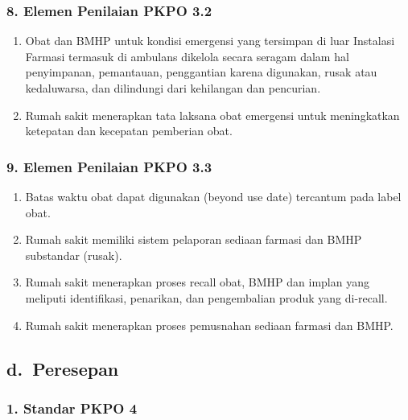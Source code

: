 \documentclass[
]{book}
\providecommand{\tightlist}{%
  \setlength{\itemsep}{0pt}\setlength{\parskip}{0pt}}
\begin{document}
\hypertarget{elemen-penilaian-pkpo-3.2}{%
\subsubsection*{8. Elemen Penilaian PKPO 3.2}\label{elemen-penilaian-pkpo-3.2}}

\begin{enumerate}
\def\labelenumi{\alph{enumi}.}
\tightlist
\item
  Obat dan BMHP untuk kondisi emergensi yang tersimpan di luar Instalasi Farmasi termasuk di ambulans dikelola secara seragam dalam hal penyimpanan, pemantauan, penggantian karena digunakan, rusak atau kedaluwarsa, dan dilindungi dari kehilangan dan pencurian.
\item
  Rumah sakit menerapkan tata laksana obat emergensi untuk meningkatkan ketepatan dan kecepatan pemberian obat.
\end{enumerate}

\hypertarget{elemen-penilaian-pkpo-3.3}{%
\subsubsection*{9. Elemen Penilaian PKPO 3.3}\label{elemen-penilaian-pkpo-3.3}}

\begin{enumerate}
\def\labelenumi{\alph{enumi}.}
\tightlist
\item
  Batas waktu obat dapat digunakan (beyond use date) tercantum pada label obat.
\item
  Rumah sakit memiliki sistem pelaporan sediaan farmasi dan BMHP substandar (rusak).
\item
  Rumah sakit menerapkan proses recall obat, BMHP dan implan yang meliputi identifikasi, penarikan, dan pengembalian produk yang di-recall.
\item
  Rumah sakit menerapkan proses pemusnahan sediaan farmasi dan BMHP.
\end{enumerate}

\hypertarget{d.-peresepan}{%
\subsection*{d.~Peresepan}\label{d.-peresepan}}

\hypertarget{standar-pkpo-4}{%
\subsubsection*{1. Standar PKPO 4}\label{standar-pkpo-4}}
\end{document}
